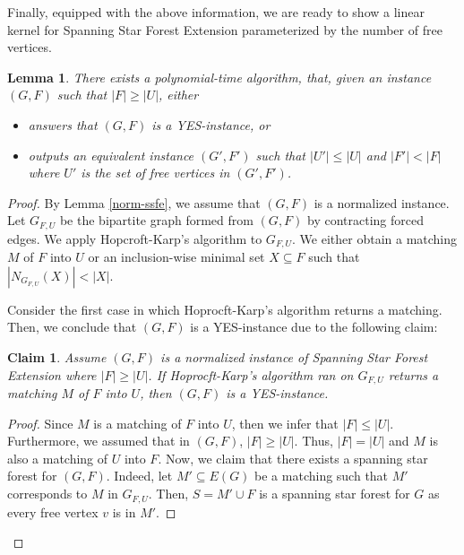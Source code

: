 \documentclass[en]{pracamgr}
\newtheorem{lemma}{Lemma}
\newtheorem{claim}{Claim}
\theoremstyle{definition}
\newcommand{\ssfep}{{\sc Spanning Star Forest Extension}}
\begin{document}
Finally, equipped with the above information, we are ready to show a linear kernel for \ssfep{}  parameterized by the number of free vertices.

\begin{lemma}\label{kernel-ssfep}
	There exists a polynomial-time algorithm, that, given an instance $(G,F)$ such that $|F| \geq |U|$, either
	\begin{itemize}
		\item answers that $(G,F)$ is a YES-instance, or
		\item outputs an equivalent instance $(G',F')$ such that $|U'| \leq |U|$ and $|F'| < |F|$ where $U'$ is the set of free vertices in $(G',F')$.
	\end{itemize} 
\end{lemma}


\begin{proof}
	By Lemma \ref{norm-ssfe}, we assume that $(G,F)$ is a normalized instance. Let $G_{F,U}$ be the 	 bipartite graph formed from $(G,F)$ by contracting forced edges. We apply Hopcroft-Karp's algorithm to $G_{F,U}$. We either obtain a matching $M$ of $F$ into $U$ or an inclusion-wise minimal set $X \subseteq F$ such that $|N_{G_{F,U}}(X)| < |X|$.

	Consider the first case in which Hoprocft-Karp's algorithm returns a matching. Then, we conclude that $(G,F)$ is a YES-instance due to the following claim:
	\begin{claim}
		Assume $(G,F)$ is a normalized instance of \ssfep{} where $|F| \geq |U|$. If Hoprocft-Karp's algorithm ran on $G_{F,U}$ returns a matching $M$ of $F$ into $U$, then $(G,F)$ is a YES-instance.
	\end{claim}

	\begin{proof}
		Since $M$ is a matching of $F$ into $U$, then we infer that $|F| \leq |U|$. Furthermore, we assumed that in $(G,F)$, $|F| \geq |U|$. Thus, $|F|=|U|$ and $M$ is also a matching of $U$ into $F$. Now, we claim that there exists a spanning star forest for $(G,F)$. Indeed, let $M' \subseteq E(G)$ be a matching such that $M'$ corresponds to $M$ in $G_{F,U}$. Then, $S = M' \cup F$ is a spanning star forest for $G$ as every free vertex $v$ is in $M'$.
	\end{proof}


\end{proof}
\end{document}
